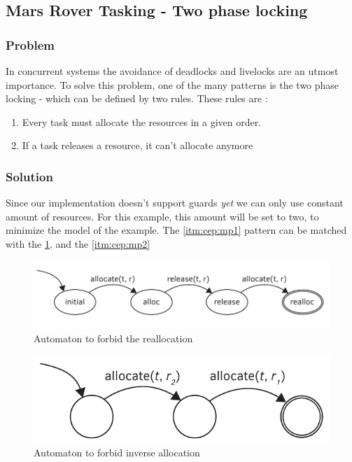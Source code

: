 		
		
		\subsection{Mars Rover Tasking - Two phase locking}
			\subsubsection{Problem}
				In concurrent systems the avoidance of deadlocks and livelocks are an utmost importance.
				To solve this problem, one of the many patterns is  the two phase locking - which can be defined by two rules.
				These rules are : 
				\begin{enumerate}
					\item \label{itm:cep:mp1} Every task must allocate the resources in a given order.
					\item \label{itm:cep:mp2} If a task releases a resource, it can't allocate anymore
				\end{enumerate}
			\subsubsection{Solution}
				Since our implementation doesn't support guards \emph{yet} we can only use constant amount of resources.
				For this example, this amount will be set to two, to minimize the model of the example.
				The \cref{itm:cep:mp1} pattern can be matched with the \cref {fig:cep:marsautomaton1}, and the \cref{itm:cep:mp2} 

				\begin{figure}[h]
				\centering
				\includegraphics[width=0.7\linewidth]{include/figures/chapter_5/mars_example_aut1}
				\caption{Automaton to forbid the reallocation}
				\label{fig:cep:marsautomaton1}
				\end{figure}		
				
				
				\begin{figure}[h]
				\centering
				\includegraphics[width=0.7\linewidth]{include/figures/chapter_5/mars_example_aut2}
				\caption{Automaton to forbid inverse allocation}
				\label{fig:cep:marsautomaton2}
				\end{figure}	

